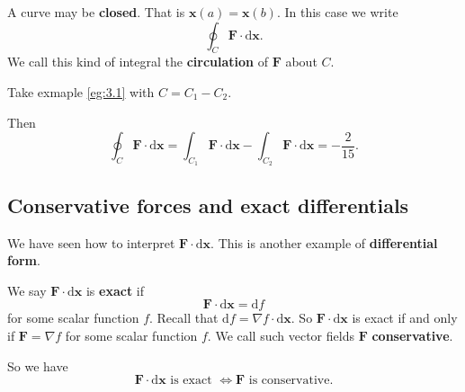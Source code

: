 A curve may be \textbf{closed}. That is $ \mathbf{x}(a)=\mathbf{x}(b) $. In this case we write 
\[
    \oint_{C}\mathbf{F}\cdot \mathrm{d}\mathbf{x}.
\]
We call this kind of integral the \textbf{circulation} of $\mathbf{F}$ about $C$.

\begin{example}
    Take exmaple \ref{eg:3.1} with $ C=C_1-C_2 $.
    \begin{center}
      \end{center}
      Then 
      \[
          \oint_{C} \mathbf{F} \cdot\mathrm{d}\mathbf{x} = \int_{C_1} \mathbf{F} \cdot\mathrm{d}\mathbf{x}-\int_{C_2} \mathbf{F} \cdot\mathrm{d}\mathbf{x} = -\frac{2}{15}.
      \]
\end{example}

\subsection{Conservative forces and exact differentials}
We have seen how to interpret $ \mathbf{F}\cdot\mathrm{d}\mathbf{x} $. This is another example of \textbf{differential form}.
\begin{definition}
    We say $\mathbf{F}\cdot\mathrm{d}\mathbf{x}$ is \textbf{exact} if 
    \[
        \mathbf{F}\cdot\mathrm{d}\mathbf{x} = \mathrm{d} f
    \]
    for some scalar function $f$. Recall that $ \mathrm{d} f = \nabla f\cdot\mathrm{d}\mathbf{x} $. So $ \mathbf{F}\cdot\mathrm{d}\mathbf{x} $ is exact if and only if $ \mathbf{F} = \nabla f $ for some scalar function $f$. We call such vector fields $\mathbf{F}$ \textbf{conservative}.
\end{definition}
So we have 
\[
    \mathbf{F}\cdot\mathrm{d}\mathbf{x} \text{ is exact }\Longleftrightarrow \mathbf{F} \text{ is conservative}.
\]

